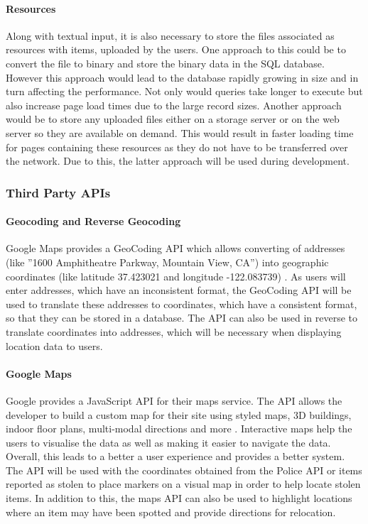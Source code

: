 \paragraph{Resources}
Along with textual input, it is also necessary to store the files associated as resources with items, uploaded by the users. One approach to this could be to convert the file to binary and store the binary data in the SQL database. However this approach would lead to the database rapidly growing in size and in turn affecting the performance. Not only would queries take longer to execute but also increase page load times due to the large record sizes. Another approach would be to store any uploaded files either on a storage server or on the web server so they are available on demand. This would result in faster loading time for pages containing these resources as they do not have to be transferred over the network. Due to this, the latter approach will be used during development.

\subsubsection{Third Party APIs}

\paragraph{Geocoding and Reverse Geocoding} Google Maps provides a GeoCoding API which allows converting of addresses (like ”1600 Amphitheatre Parkway, Mountain View, CA”) into geographic coordinates (like latitude 37.423021 and longitude -122.083739) \cite{Google:GeoCoding}. As users will enter addresses, which have an inconsistent format, the GeoCoding API will be used to translate these addresses to coordinates, which have a consistent format, so that they can be stored in a database. The API can also be used in reverse to translate coordinates into addresses, which will be necessary when displaying location data to users.

\paragraph{Google Maps} Google provides a JavaScript API for their maps service. The API allows the developer to build a custom map for their site using styled maps, 3D buildings, indoor floor plans, multi-modal directions and more \cite{Google:Maps}. Interactive maps help the users to visualise the data as well as making it easier to navigate the data. Overall, this leads to a better a user experience and provides a better system. The API will be used with the coordinates obtained from the Police API or items reported as stolen to place markers on a visual map in order to help locate stolen items. In addition to this, the maps API can also be used to highlight locations where an item may have been spotted and provide directions for relocation.

